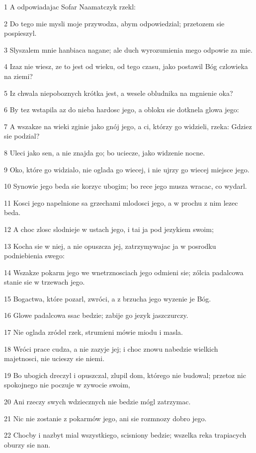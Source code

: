 \par 1 A odpowiadajac Sofar Naamatczyk rzekl:
\par 2 Do tego mie mysli moje przywodza, abym odpowiedzial; przetozem sie pospieszyl.
\par 3 Slyszalem mnie hanbiaca nagane; ale duch wyrozumienia mego odpowie za mie.
\par 4 Izaz nie wiesz, ze to jest od wieku, od tego czasu, jako postawil Bóg czlowieka na ziemi?
\par 5 Iz chwala niepoboznych krótka jest, a wesele obludnika na mgnienie oka?
\par 6 By tez wstapila az do nieba hardosc jego, a obloku sie dotknela glowa jego:
\par 7 A wszakze na wieki zginie jako gnój jego, a ci, którzy go widzieli, rzeka: Gdziez sie podzial?
\par 8 Uleci jako sen, a nie znajda go; bo uciecze, jako widzenie nocne.
\par 9 Oko, które go widzialo, nie oglada go wiecej, i nie ujrzy go wiecej miejsce jego.
\par 10 Synowie jego beda sie korzyc ubogim; bo rece jego musza wracac, co wydarl.
\par 11 Kosci jego napelnione sa grzechami mlodosci jego, a w prochu z nim lezec beda.
\par 12 A choc zlosc slodnieje w ustach jego, i tai ja pod jezykiem swoim;
\par 13 Kocha sie w niej, a nie opuszcza jej, zatrzymywajac ja w posrodku podniebienia swego:
\par 14 Wszakze pokarm jego we wnetrznosciach jego odmieni sie; zólcia padalcowa stanie sie w trzewach jego.
\par 15 Bogactwa, które pozarl, zwróci, a z brzucha jego wyzenie je Bóg.
\par 16 Glowe padalcowa ssac bedzie; zabije go jezyk jaszczurczy.
\par 17 Nie oglada zródel rzek, strumieni mówie miodu i masla.
\par 18 Wróci prace cudza, a nie zazyje jej; i choc znowu nabedzie wielkich majetnosci, nie ucieszy sie niemi.
\par 19 Bo ubogich dreczyl i opuszczal, zlupil dom, którego nie budowal; przetoz nic spokojnego nie poczuje w zywocie swoim,
\par 20 Ani rzeczy swych wdziecznych nie bedzie mógl zatrzymac.
\par 21 Nic nie zostanie z pokarmów jego, ani sie rozmnozy dobro jego.
\par 22 Chocby i nazbyt mial wszystkiego, scisniony bedzie; wszelka reka trapiacych oburzy sie nan.
